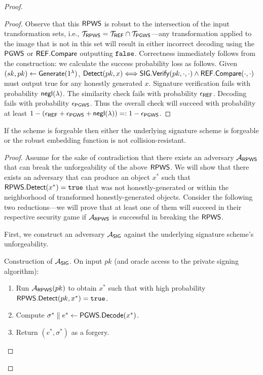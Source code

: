 \documentclass[12pt]{article}
\begin{document}
\begin{proof}
\begin{proof}
Observe that this $\mathsf{RPWS}$ is robust to the intersection of the input transformation sets, i.e., $\mathcal{T}_{\mathsf{RPWS}} = \mathcal{T}_{\mathsf{REF}} \cap \mathcal{T}_{\mathsf{PGWS}}$---any transformation applied to the image that is not in this set will result in either incorrect decoding using the $\mathsf{PGWS}$ or $\mathsf{REF}.\mathsf{Compare}$ outputting $\mathtt{false}$.
Correctness immediately follows from the construction: we calculate the success probability loss as follows.
Given $(sk, pk) \gets \mathsf{Generate}(1^\lambda)$, $\mathsf{Detect}(pk, x) \Longleftrightarrow \mathsf{SIG}.\mathsf{Verify}(pk, \cdot, \cdot) \land \mathsf{REF}.\mathsf{Compare}(\cdot, \cdot)$ must output true for any honestly generated $x$.
Signature verification fails with probability $\mathsf{negl}(\lambda)$.
The similarity check fails with probability $\epsilon_{\mathsf{REF}}$.
Decoding fails with probability $\epsilon_{\mathsf{PGWS}}$.
Thus the overall check will succeed with probability at least $1 - (\epsilon_{\mathsf{REF}} + \epsilon_{\mathsf{PGWS}} + \mathsf{negl}(\lambda)) =: 1 - \epsilon_{\mathsf{PGWS}}$.
\end{proof}

\begin{claim}\label{clm:wm_forge_to_sig_or_ref}
If the scheme is forgeable then either the underlying signature scheme is forgeable or the robust embedding function is not collision-resistant.
\end{claim}

\begin{proof}
Assume for the sake of contradiction that there exists an adversary $\mathcal{A}_{\mathsf{RPWS}}$ that can break the unforgeability of the above $\mathsf{RPWS}$.
We will show that there exists an adversary that can produce an object $x^*$ such that $\mathsf{RPWS}.\mathsf{Detect}(x^*) = \mathtt{true}$ that was not honestly-generated or within the neighborhood of transformed honestly-generated objects.
Consider the following two reductions---we will prove that at least one of them will succeed in their respective security game if $\mathcal{A}_{\mathsf{RPWS}}$ is successful in breaking the $\mathsf{RPWS}$.

First, we construct an adversary $\mathcal{A}_{\mathsf{SIG}}$ against the underlying signature scheme's unforgeability.

Construction of $\mathcal{A}_{\mathsf{SIG}}$. On input $pk$ (and oracle access to the private signing algorithm):
\begin{enumerate}
    \item Run $\mathcal{A}_{\mathsf{RPWS}}(pk)$ to obtain $x^*$ such that with high probability $\mathsf{RPWS}.\mathsf{Detect}(pk, x^*) = \mathtt{true}$.
    \item Compute $\sigma^* \parallel e^* \gets \mathsf{PGWS}.\mathsf{Decode}(x^*)$.
    \item Return $(e^*, \sigma^*)$ as a forgery.
\end{enumerate}


\end{proof}
\end{proof}
\end{document}
